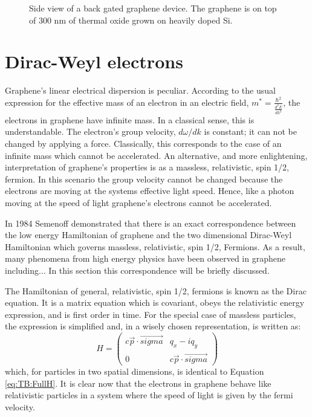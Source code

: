 \begin{figure}
	\begin{center}
	
	\end{center}
	\caption{\label{fig:TB:FET} Side view of a back gated graphene device.  The graphene is on top of 300 nm of thermal oxide grown on heavily doped Si. }	
\end{figure}

\section{Dirac-Weyl electrons}
Graphene's linear electrical dispersion is peculiar.
According to the usual expression for the effective mass of an electron in an electric field, $m^*=\frac{\hbar^2}{\frac{d^2 E}{d k^2}}$, \cite{Kittel2005} the electrons in graphene have infinite mass.
In a classical sense, this is understandable.
The electron's group velocity, $d \omega/d k$ is constant; it can not be changed by applying a force.
Classically, this corresponds to the case of an infinite mass which cannot be accelerated.
An alternative, and more enlightening, interpretation of graphene's properties is as a massless, relativistic, spin 1/2, fermion.
In this scenario the group velocity cannot be changed because the electrons are moving at the systems effective light speed.
Hence, like a photon moving at the speed of light graphene's electrons cannot be accelerated.

In 1984 Semenoff demonstrated that there is an exact correspondence between the low energy Hamiltonian of graphene and the two dimensional Dirac-Weyl Hamiltonian\cite{Semenoff1984} which governs massless, relativistic, spin 1/2, Fermions.
As a result, many phenomena from high energy physics have been observed in graphene including...
In this section this correspondence will be briefly discussed.

The Hamiltonian of general, relativistic, spin 1/2, fermions is known as the Dirac equation.
It is a matrix equation which is covariant, obeys the relativistic energy expression, and is first order in time.
For the special case of massless particles, the expression is simplified and, in a wisely chosen representation, is written as:
\begin{equation*}
	H=\left( \begin{array}{cc}
			c \vec{p} \cdot \vec{sigma}              & q_x - i q_y\\
			0              & c \vec{p} \cdot \vec{sigma}			   	            			\end{array} \right)
\end{equation*}
which, for particles in two spatial dimensions, is identical to Equation \ref{eq:TB:FullH}.
It is clear now that the electrons in graphene behave like relativistic particles in a system where the speed of light is given by the fermi velocity.

